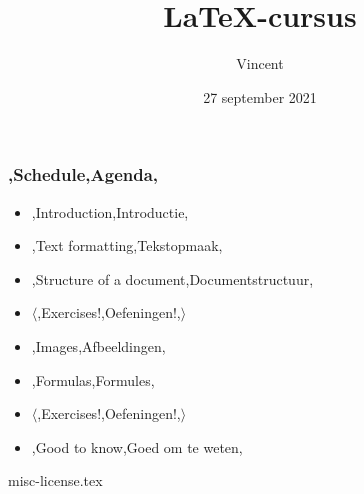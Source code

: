 \documentclass{../../cursuspresentatie}
\title{\LaTeX{}-cursus}
\author{Vincent}
\date{27 september 2021}
\def\importslide#1#2{%
	{#2}
}
\begin{document}

\begin{frame}
	\titlepage
	\centering
\end{frame}

\begin{frame}
	\frametitle{\lang,Schedule,Agenda,}
	
	\begin{itemize}
		\item \lang,Introduction,Introductie,
		\item \lang,Text formatting,Tekstopmaak,
		\item \lang,Structure of a document,Documentstructuur,
		\item $ \langle $\lang,Exercises!,Oefeningen!,$ \rangle $
		\item \lang,Images,Afbeeldingen,
		\item \lang,Formulas,Formules,
		\item $ \mathbf\langle $\lang,Exercises!,Oefeningen!,$ \rangle $
		\item \lang,Good to know,Goed om te weten,
	\end{itemize}
\end{frame}











% 



\ifishandout
	\importslide{misc}{misc-license.tex}
\fi
	
\end{document}
